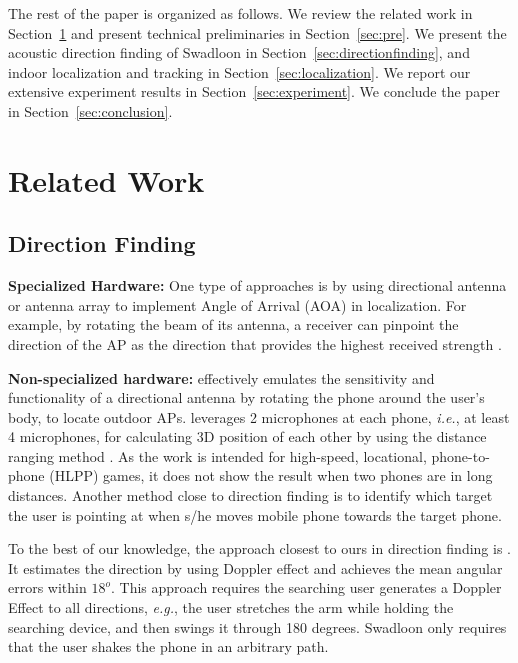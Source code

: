 \documentclass[]{sig-alternate-10pt}
\def\ie{\textit{i.e.}\xspace}
\def\eg{\textit{e.g.}\xspace}
\def \ourprotocol{Swadloon\xspace}
\begin{document}
The rest of the paper is organized as follows.
We review the related work in Section~\ref{sec:related} and
 present technical preliminaries in Section~\ref{sec:pre}.
We present the acoustic direction finding of \ourprotocol in
 Section~\ref{sec:directionfinding},
 and indoor localization and tracking in
 Section~\ref{sec:localization}.
We report our extensive experiment
results in Section~\ref{sec:experiment}.
We conclude the paper in Section~\ref{sec:conclusion}.

\section{Related Work}
\label{sec:related}

\subsection{Direction Finding}

\noindent\textbf{Specialized Hardware:}  
One type of approaches is by using directional antenna
\cite{4711074,4509717,Niculescu:2004:VBS:1023720.1023727} or antenna array \cite{DBLP:journals/cee/KulakowskiVELG10} to implement Angle of Arrival (AOA) \cite{2003-INFOCOM-AdHocPositioning} in localization.  For
example, by rotating the beam of its antenna, a receiver can pinpoint
the direction of the AP as the direction that provides the highest
received strength \cite{4509717}.

\noindent\textbf{Non-specialized hardware:}
 \cite{2011-MOBICOM-Iamantenna} effectively emulates the
sensitivity and functionality of a directional antenna by rotating the
phone around the user's body, to locate outdoor APs. \cite{2011-SenSys-feasibilityrealtime}
leverages 2 microphones at each phone, \ie, at least 4 microphones,
for calculating 3D position of each other by using the distance
ranging method \cite{2007-SenSys-BeepBeephighaccuracy}. As the work is
intended for high-speed, locational, phone-to-phone (HLPP) games, it does not show the result when two phones are in long distances. Another
method \cite{2009-MobiSys-Point&Connectintentionbased} close to
direction finding is to identify which target the user is pointing at
when s/he moves mobile phone towards the target phone. 

To the best of our knowledge, the approach closest to ours in
direction finding is 
\cite{2012-MobiQuitous2011-ProposalDirectionEstimation}. It  
estimates the direction by using Doppler effect and achieves the mean angular errors within $18^o$. This approach
requires the searching user generates a Doppler Effect to all
directions, \eg, the user stretches the arm while holding the
searching device, and then swings it through 180 degrees. \ourprotocol only requires that the user shakes the phone in an
arbitrary path. 
\end{document}
